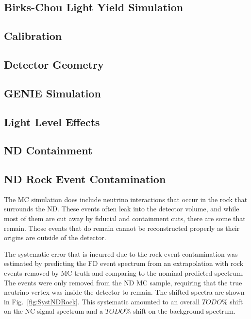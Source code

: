 \subsection{Birks-Chou Light Yield Simulation}

\subsection{Calibration}

\subsection{Detector Geometry}

\subsection{GENIE Simulation}

\subsection{Light Level Effects}

\subsection{ND Containment}

\subsection{ND Rock Event Contamination}

The MC simulation does include neutrino interactions that occur in the rock that surrounds the ND. These events often leak into the detector volume, and while most of them are cut away by fiducial and containment cuts, there are some that remain. Those events that do remain cannot be reconstructed properly as their origins are outside of the detector. 

The systematic error that is incurred due to the rock event contamination was estimated by predicting the FD event spectrum from an extrapolation with rock events removed by MC truth and comparing to the nominal predicted spectrum. The events were only removed from the ND MC sample, requiring that the true neutrino vertex was inside the detector to remain. The shifted spectra are shown in Fig.~\ref{fig:SystNDRock}. This systematic amounted to an overall $TODO\%$ shift on the NC signal spectrum and a $TODO\%$ shift on the background spectrum.


